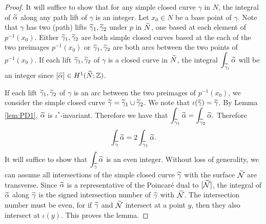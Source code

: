 \begin{proof}
 It will suffice to show that for any simple closed curve $\gamma$ in $N$, the integral of $\widetilde{\alpha}$ along any path lift of $\gamma$ is an integer.  Let $x_0\in N$ be a base point of $\gamma$.  Note that $\gamma$ has two (path) lifts $\widetilde{\gamma}_1,\widetilde{\gamma}_2$ under $p$ in $\widetilde{N}$, one based at each element of $p^{-1}(x_0)$.  Either $\widetilde{\gamma}_1,\widetilde{\gamma}_2$ are both simple closed curves based at the each of the two preimages $p^{-1}(x_0)$ or $\widetilde{\gamma}_1,\widetilde{\gamma}_2$ are both arcs between the two points of $p^{-1}(x_0)$.
  If each lift $\widetilde{\gamma}_1,\widetilde{\gamma}_2$ of $\gamma$ is a closed curve in $\widetilde{N}$, the integral $\displaystyle\int_{\widetilde{\gamma}_i}\widetilde{\alpha}$ will be an integer since $[\widetilde{\alpha}] \in H^1(\widetilde{N}; \mathbb{Z})$.

 If each lift $\widetilde{\gamma}_1,\widetilde{\gamma}_2$ of $\gamma$ is an arc between the two preimages of $p^{-1}(x_0)$, we consider the simple closed curve $\widetilde{\gamma}=\widetilde{\gamma}_1\cup\widetilde{\gamma}_2$.  We note that $\iota(\widetilde{\gamma})=\widetilde{\gamma}$.
  By Lemma \ref{lem:PD1}, $\widetilde{\alpha}$ is $\iota^{\ast}$-invariant.  Therefore we have that $ \displaystyle\int_{\widetilde{\gamma}_1} \widetilde{\alpha} = \displaystyle\int_{\widetilde{\gamma}_2} \widetilde{\alpha}.$  Therefore $$\int_{\widetilde{\gamma}}\widetilde{\alpha}=2\int_{\widetilde{\gamma}_1}\widetilde{\alpha}.$$ It will suffice to show that $\displaystyle\int_{\widetilde{\gamma}}\widetilde{\alpha}$ is an even integer.
  Without loss of generality, we can assume all intersections of the simple closed curve $\widetilde{\gamma}$ with the surface $\widetilde{\mathcal{N}}$ are transverse.
  Since $\widetilde{\alpha}$ is a representative of the Poincar\'e dual to $[\widetilde{\mathcal{N}}]$, the integral of $\widetilde{\alpha}$ along $\widetilde{\gamma}$ is the signed intersection number of $\widetilde{\gamma}$ with $\widetilde{\mathcal{N}}$.
  The intersection number must be even, for if $\widetilde{\gamma}$ and $\widetilde{\mathcal{N}}$ intersect at a point $y$, then they also intersect at $\iota(y)$. This proves the lemma.
\end{proof}


